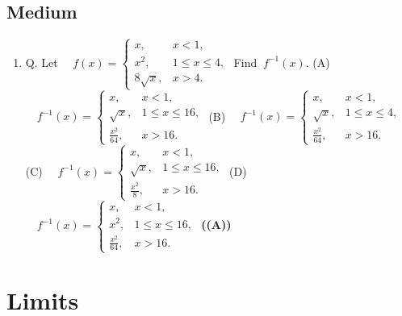 \documentclass{article}
\begin{document}
\subsection{Medium}
\begin{enumerate}
\item Q. Let
$\quad f(x) = \begin{cases} x, & x < 1, \\ x^2, & 1 \le x \le 4, \\ 8\sqrt{x}, & x > 4. \end{cases}$
Find $\ f^{-1}(x).$
(A) $\quad f^{-1}(x) = \begin{cases} x, & x < 1, \\ \sqrt{x}, & 1 \le x \le 16, \\ \frac{x^2}{64}, & x > 16. \end{cases}$
(B) $\quad f^{-1}(x) = \begin{cases} x, & x < 1, \\ \sqrt{x}, & 1 \le x \le 4, \\ \frac{x^2}{64}, & x > 16. \end{cases}$
(C) $\quad f^{-1}(x) = \begin{cases} x, & x < 1, \\ \sqrt{x}, & 1 \le x \le 16, \\ \frac{x^2}{8}, & x > 16. \end{cases}$
(D) $\quad f^{-1}(x) = \begin{cases} x, & x < 1, \\ x^2, & 1 \le x \le 16, \\ \frac{x^2}{64}, & x > 16. \end{cases}$ \hfill \textbf{((A))}
\end{enumerate}
\section{Limits}
\end{document}

